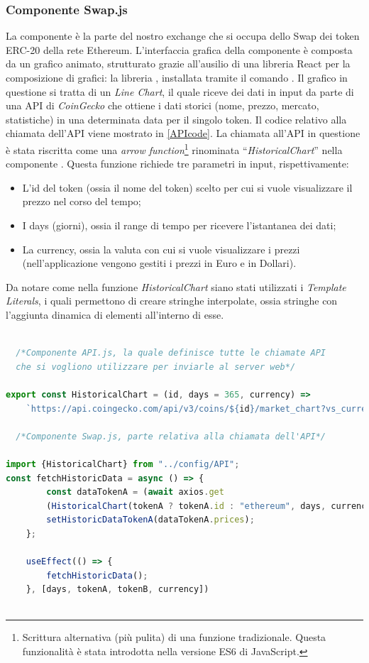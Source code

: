 \subsubsection{Componente Swap.js}\makeatletter{}\makeatother\label{Swap.js}
La componente  è la parte del nostro exchange che si occupa dello Swap dei token ERC-20 della rete Ethereum. L'interfaccia grafica della componente è composta da un grafico animato, strutturato grazie all'ausilio di una libreria React per la composizione di grafici: la libreria , installata tramite il comando . Il grafico in questione si tratta di un \textit{Line Chart}, il quale riceve dei dati in input da parte di una API di \textit{CoinGecko} \cite{CoinGecko} che ottiene i dati storici (nome, prezzo, mercato, statistiche) in una determinata data per il singolo token. Il codice relativo alla chiamata dell'API viene mostrato in \ref{APIcode}. La chiamata all'API in questione è stata riscritta come una \textit{arrow function}\footnote{Scrittura alternativa (più pulita) di una funzione tradizionale. Questa funzionalità è stata introdotta nella versione ES6 di JavaScript.} rinominata “\textit{HistoricalChart}” nella componente . Questa funzione richiede tre parametri in input, rispettivamente: 
\begin{itemize}
\item L'id del token (ossia il nome del token) scelto per cui si vuole visualizzare il prezzo nel corso del tempo;
\item I days (giorni), ossia il range di tempo per ricevere l'istantanea dei dati;
\item La currency, ossia la valuta con cui si vuole visualizzare i prezzi (nell'applicazione vengono gestiti i prezzi in Euro e in Dollari).
\end{itemize}
Da notare come nella funzione \textit{HistoricalChart} siano stati utilizzati i \textit{Template Literals}, i quali permettono di creare stringhe interpolate, ossia stringhe con l'aggiunta dinamica di elementi all'interno di esse. 
\begin{lstlisting}[caption={[API Code]},language=jsx] 

  /*Componente API.js, la quale definisce tutte le chiamate API
  che si vogliono utilizzare per inviarle al server web*/
  
export const HistoricalChart = (id, days = 365, currency) =>
    `https://api.coingecko.com/api/v3/coins/${id}/market_chart?vs_currency=${currency}&days=${days}`;

  /*Componente Swap.js, parte relativa alla chiamata dell'API*/
  
import {HistoricalChart} from "../config/API";  
const fetchHistoricData = async () => {
        const dataTokenA = (await axios.get
        (HistoricalChart(tokenA ? tokenA.id : "ethereum", days, currency))).data;
        setHistoricDataTokenA(dataTokenA.prices);
    };

    useEffect(() => {
        fetchHistoricData();
    }, [days, tokenA, tokenB, currency])
    																							       -APIcode
\end{lstlisting}\makeatletter\def\@currentlabel{APIcode}\makeatother
